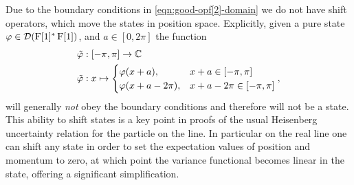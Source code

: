 Due to the boundary conditions in \eqref{eqn:good-opf[2]-domain} we do not have shift operators, which move the states in position space. Explicitly, given a pure state $\varphi\in\mathcal{D}(\operatorname{F}[1]^*\operatorname{F}[1])$, and $a\in [0,2\pi] $ the function
\begin{align}
  \tilde{\varphi}&:[-\pi,\pi]\to \mathbb{C}\\
  \tilde{\varphi}&:x\mapsto \begin{cases}\varphi(x+a), & x+a\in [-\pi,\pi]\\ \varphi(x+a-2\pi), & x+a-2\pi\in [-\pi,\pi]\end{cases},
\end{align}
will generally \emph{not} obey the boundary conditions and therefore will not be a state. This ability to shift states is a key point in proofs of the usual Heisenberg uncertainty relation for the particle on the line. In particular on the real line one can shift any state in order to set the expectation values of position and momentum to zero, at which point the variance functional becomes linear in the state, offering a significant simplification.

